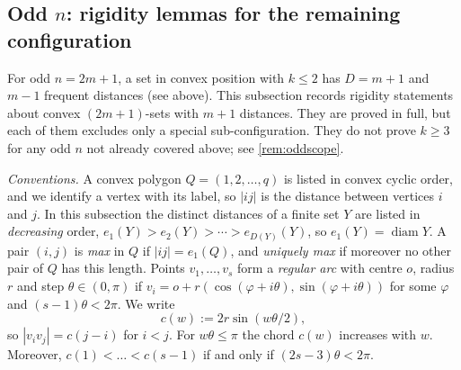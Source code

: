 
\subsection{Odd \texorpdfstring{$n$}{n}: rigidity lemmas for the remaining configuration}\label{sec:oddrigid}

For odd $n=2m+1$, a set in convex position with $k\le2$ has $D=m+1$ and $m-1$ frequent distances (see above). This subsection records rigidity statements about convex $(2m+1)$-sets with $m+1$ distances. They are proved in full, but each of them excludes only a special sub-configuration. They do not prove $k\ge3$ for any odd $n$ not already covered above; see \cref{rem:oddscope}.

\emph{Conventions.} A convex polygon $Q=(1,2,\dots,q)$ is listed in convex cyclic order, and we identify a vertex with its label, so $|ij|$ is the distance between vertices $i$ and $j$. In this subsection the distinct distances of a finite set $Y$ are listed in \emph{decreasing} order, $e_1(Y)>e_2(Y)>\cdots>e_{D(Y)}(Y)$, so $e_1(Y)=\operatorname{diam}Y$. A pair $(i,j)$ is \emph{max} in $Q$ if $|ij|=e_1(Q)$, and \emph{uniquely max} if moreover no other pair of $Q$ has this length. Points $v_1,\dots,v_s$ form a \emph{regular arc} with centre $o$, radius $r$ and step $\theta\in(0,\pi)$ if $v_i=o+r(\cos(\varphi+i\theta),\sin(\varphi+i\theta))$ for some $\varphi$ and $(s-1)\theta<2\pi$. We write
\[
c(w):=2r\sin(w\theta/2),
\]
so $|v_iv_j|=c(j-i)$ for $i<j$. For $w\theta\le\pi$ the chord $c(w)$ increases with $w$. Moreover, $c(1)<\dots<c(s-1)$ if and only if $(2s-3)\theta<2\pi$.

